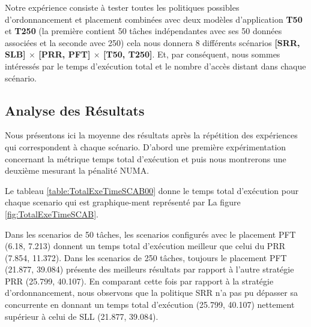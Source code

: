 Notre expérience consiste à tester toutes les politiques possibles d'ordonnancement et placement combinées avec deux modèles d'application \textbf{T50} et \textbf{T250} (la première contient 50 tâches indépendantes avec ses 50 données associées et la seconde avec 250) cela nous donnera 8 différents scénarios \textbf{[SRR, SLB] $\times$ [PRR, PFT] $\times$ [T50, T250]}. Et, par conséquent, nous sommes intéressés par le temps d'exécution total et le nombre d'accès distant dans chaque scénario.
%
\subsection{Analyse des Résultats}
%
Nous présentons ici la moyenne des résultats après la répétition des expériences qui correspondent à chaque scénario. D’abord une première expérimentation concernant la métrique temps total d'exécution et puis nous montrerons une deuxième mesurant la pénalité NUMA. 

Le tableau \ref{table:TotalExeTimeSCAB00} donne le temps total d'exécution pour chaque scenario qui est graphique-ment représenté par La figure \ref{fig:TotalExeTimeSCAB}.

Dans les scenarios de 50 tâches, les scenarios configurés avec le placement PFT (6.18, 7.213) donnent un temps total d'exécution meilleur que celui du PRR (7.854, 11.372). Dans les scenarios de 250 tâches, toujours le placement PFT (21.877, 39.084) présente des meilleurs résultats par rapport à l'autre stratégie PRR (25.799, 40.107). En comparant cette fois par rapport à la stratégie d'ordonnancement, nous observons que la politique SRR n'a pas pu dépasser sa concurrente en donnant un temps total d'exécution (25.799, 40.107) nettement supérieur à celui de SLL (21.877, 39.084). 

